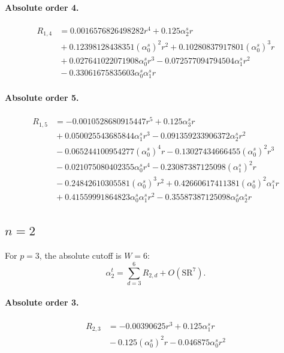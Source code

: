 \documentclass[10pt]{article}
\begin{document}
\paragraph{Absolute order 4.}
\begin{align*}
R_{1,4} &= 0.0016576826498282 r^{4} + 0.125 \alpha_{2}^s r \\
&{}  + 0.12398128438351 \left(\alpha_{0}^s\right)^{2} r^{2} + 0.10280837917801 \left(\alpha_{0}^s\right)^{3} r \\
&{}  + 0.027641022071908 \alpha_{0}^s r^{3} - 0.072577094794504 \alpha_{1}^s r^{2} \\
&{}  - 0.33061675835603 \alpha_{0}^s \alpha_{1}^s r
\end{align*}

\paragraph{Absolute order 5.}
\begin{align*}
R_{1,5} &=  - 0.0010528680915447 r^{5} + 0.125 \alpha_{3}^s r \\
&{}  + 0.050025543685844 \alpha_{1}^s r^{3} - 0.091359233906372 \alpha_{2}^s r^{2} \\
&{}  - 0.065244100954277 \left(\alpha_{0}^s\right)^{4} r - 0.13027434666455 \left(\alpha_{0}^s\right)^{2} r^{3} \\
&{}  - 0.021075080402355 \alpha_{0}^s r^{4} - 0.23087387125098 \left(\alpha_{1}^s\right)^{2} r \\
&{}  - 0.24842610305581 \left(\alpha_{0}^s\right)^{3} r^{2} + 0.42660617411381 \left(\alpha_{0}^s\right)^{2} \alpha_{1}^s r \\
&{}  + 0.41559991864823 \alpha_{0}^s \alpha_{1}^s r^{2} - 0.35587387125098 \alpha_{0}^s \alpha_{2}^s r
\end{align*}

\subsection{$n=2$}
For $p=3$, the absolute cutoff is $W=6$:
\[\alpha_{2}^t=\sum_{d=3}^{6}R_{2,d}+O(\mathrm{SR}^{7}).\]
\paragraph{Absolute order 3.}
\begin{align*}
R_{2,3} &=  - 0.00390625 r^{3} + 0.125 \alpha_{1}^s r \\
&{}  - 0.125 \left(\alpha_{0}^s\right)^{2} r - 0.046875 \alpha_{0}^s r^{2}
\end{align*}
\end{document}
